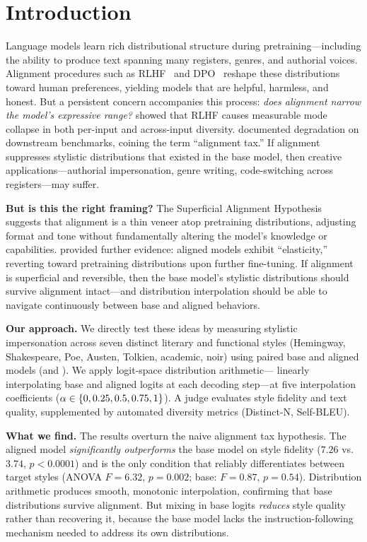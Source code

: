 \section{Introduction}
\label{sec:intro}

Language models learn rich distributional structure during pretraining---including
the ability to produce text spanning many registers, genres, and authorial voices.
Alignment procedures such as RLHF~\cite{ouyang2022instructgpt} and
DPO~\cite{rafailov2023dpo} reshape these distributions toward human preferences,
yielding models that are helpful, harmless, and honest. But a persistent concern
accompanies this process: \emph{does alignment narrow the model's expressive range?}
\citet{kirk2023rlhf} showed that RLHF causes measurable mode collapse in both
per-input and across-input diversity. \citet{lin2023mitigating} documented
degradation on downstream benchmarks, coining the term ``alignment tax.'' If
alignment suppresses stylistic distributions that existed in the base model, then
creative applications---authorial impersonation, genre writing, code-switching
across registers---may suffer.

{\bf But is this the right framing?} The Superficial Alignment
Hypothesis~\cite{zhou2023lima} suggests that alignment is a thin veneer atop
pretraining distributions, adjusting format and tone without fundamentally altering
the model's knowledge or capabilities. \citet{ji2024resistance} provided further
evidence: aligned models exhibit ``elasticity,'' reverting toward pretraining
distributions upon further fine-tuning. If alignment is superficial and reversible,
then the base model's stylistic distributions should survive alignment intact---and
distribution interpolation should be able to navigate continuously between base and
aligned behaviors.

{\bf Our approach.} We directly test these ideas by measuring stylistic
impersonation across seven distinct literary and functional styles (Hemingway,
Shakespeare, Poe, Austen, Tolkien, academic, noir) using paired base and aligned
models (\qwenbase and \qweninst). We apply logit-space distribution arithmetic---
linearly interpolating base and aligned logits at each decoding step---at five
interpolation coefficients ($\alpha \in \{0, 0.25, 0.5, 0.75, 1\}$). A
\gptjudge judge evaluates style fidelity and text quality, supplemented by
automated diversity metrics (Distinct-N, Self-BLEU).

{\bf What we find.} The results overturn the naive alignment tax hypothesis.
The aligned model \emph{significantly outperforms} the base model on
style fidelity ($7.26$ vs.\ $3.74$, $p < 0.0001$) and is the only
condition that reliably differentiates between target styles (ANOVA
$F = 6.32$, $p = 0.002$; base: $F = 0.87$, $p = 0.54$). Distribution
arithmetic produces smooth, monotonic interpolation, confirming that base
distributions survive alignment. But mixing in base logits \emph{reduces}
style quality rather than recovering it, because the base model lacks the
instruction-following mechanism needed to address its own distributions.

